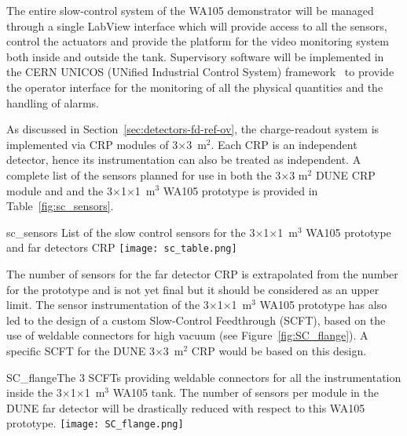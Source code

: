 The entire slow-control system of the WA105 demonstrator will be
managed through a single LabView interface\cite{WA105_SREP} which
will provide access to all the sensors, control the actuators and
provide the platform for the video monitoring system both inside and
outside the tank.  Supervisory software will be implemented in the
CERN UNICOS (UNified Industrial Control System)
framework~\cite{unicos} to provide the operator interface for the
monitoring of all the physical quantities and the handling of alarms.

As discussed in Section~\ref{sec:detectors-fd-ref-ov}, the
charge-readout system is implemented via CRP modules of
3$\times$3~m$^2$. Each CRP is an independent detector, hence its
instrumentation can also be treated as independent. A complete list of
the sensors planned for use in both the 3$\times$3 m$^2$ DUNE CRP
module and and the 3$\times$1$\times$1~m$^3$ WA105 prototype is
provided in Table~\ref{fig:sc_sensors}.
\begin{cdrfigure}{sc_sensors}
{List of the slow control sensors for the 3$\times$1$\times$1~m$^3$ WA105 prototype and far detectors CRP}
 \texttt{[image: sc\_table.png]} 
 \end{cdrfigure}

The number of sensors for the far detector CRP is extrapolated from
the number for the prototype and is not yet final but it should be
considered as an upper limit. The sensor instrumentation of the
3$\times$1$\times$1~m$^3$ WA105 prototype has also led to the design
of a custom Slow-Control Feedthrough (SCFT), based on the use of
weldable connectors for high vacuum (see
Figure~\ref{fig:SC_flange}). A specific SCFT for the DUNE
3$\times$3~m$^2$ CRP would be based on this design.
\begin{cdrfigure}{SC_flange}{The 3 SCFTs providing 
weldable connectors for all the instrumentation inside the 3$\times$1$\times$1~m$^3$  WA105 tank. 
The number of sensors per module in the DUNE far detector will be drastically 
reduced with respect to this WA105 prototype.}
  \texttt{[image: SC\_flange.png]}
 \end{cdrfigure}
